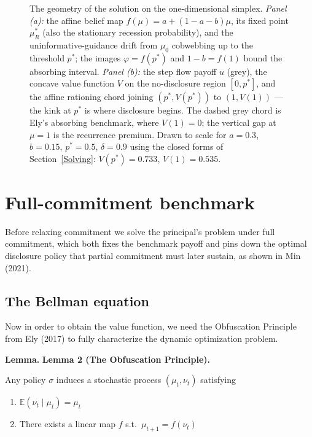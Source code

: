 \documentclass[12pt]{article}
\newenvironment{boxedlemma}[2][]{%
    \begin{mdframed}[
        linewidth=0.5pt,
        backgroundcolor=white,
        skipabove=8pt,
        skipbelow=8pt,
        innertopmargin=6pt,
        innerbottommargin=6pt
    ]
    \ifthenelse{\equal{#2}{}}
        {\textbf{Lemma#1.}}
        {\textbf{Lemma #1#2.}}
    \rmfamily\ignorespaces
}{%
    \end{mdframed}%
}
\begin{document}
\begin{figure}[H]
\begin{tikzpicture}[scale=5.6, font=\scriptsize]
\end{tikzpicture}
\caption{The geometry of the solution on the one-dimensional simplex. \emph{Panel (a):} the affine belief map $f(\mu)=a+(1-a-b)\mu$, its fixed point $\mu_R^*$ (also the stationary recession probability), and the uninformative-guidance drift from $\mu_0$ cobwebbing up to the threshold $p^*$; the images $\varphi=f(p^*)$ and $1-b=f(1)$ bound the absorbing interval. \emph{Panel (b):} the step flow payoff $u$ (grey), the concave value function $V$ on the no-disclosure region $[0,p^*]$, and the affine rationing chord joining $(p^*,V(p^*))$ to $(1,V(1))$ --- the kink at $p^*$ is where disclosure begins. The dashed grey chord is Ely's absorbing benchmark, where $V(1)=0$; the vertical gap at $\mu=1$ is the recurrence premium. Drawn to scale for $a=0.3$, $b=0.15$, $p^*=0.5$, $\delta=0.9$ using the closed forms of Section~\ref{Solving}: $V(p^*)=0.733$, $V(1)=0.535$.}
\label{fig:geometry}
\end{figure}

\section{Full-commitment benchmark}\label{FullCommitment}

Before relaxing commitment we solve the principal's problem under full commitment, which both fixes the benchmark payoff and pins down the optimal disclosure policy that partial commitment must later sustain, as shown in Min (2021).

\subsection{The Bellman equation}\label{Bellman}

Now in order to obtain the value function, we need the Obfuscation Principle from Ely (2017) to fully characterize the dynamic optimization problem.

\begin{boxedlemma}{ 2 (The Obfuscation Principle)}
Any policy $\sigma$ induces a stochastic process $(\mu_t, \nu_t)$ satisfying
\begin{enumerate}
\item $\mathbb{E}(\nu_t \mid \mu_t) = \mu_t$
\item There exists a linear map $f$ s.t.\ $\mu_{t+1} = f(\nu_t)$
\end{enumerate}
\end{boxedlemma}
\end{document}
